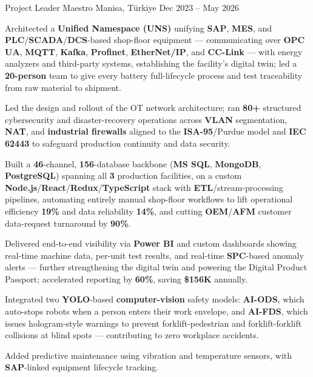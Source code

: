 \begin{cventries}
  \cventry
    {Project Leader } %
{Maestro} %
    {Manisa, Türkiye} %
    {Dec 2023 – May 2026} %
    {
      \begin{cvitems} %
        \item {Architected a \textbf{Unified Namespace (UNS)} unifying \textbf{SAP}, \textbf{MES}, and \textbf{PLC}/\textbf{SCADA}/\textbf{DCS}-based shop-floor equipment --- communicating over \textbf{OPC UA}, \textbf{MQTT}, \textbf{Kafka}, \textbf{Profinet}, \textbf{EtherNet/IP}, and \textbf{CC-Link} --- with energy analyzers and third-party systems, establishing the facility's digital twin; led a \textbf{20-person} team to give every battery full-lifecycle process and test traceability from raw material to shipment.}
        \item {Led the design and rollout of the OT network architecture; ran \textbf{80+} structured cybersecurity and disaster-recovery operations across \textbf{VLAN} segmentation, \textbf{NAT}, and \textbf{industrial firewalls} aligned to the \textbf{ISA-95}/Purdue model and \textbf{IEC 62443} to safeguard production continuity and data security.}
        \item {Built a \textbf{46}-channel, \textbf{156}-database backbone (\textbf{MS SQL}, \textbf{MongoDB}, \textbf{PostgreSQL}) spanning all \textbf{3} production facilities, on a custom \textbf{Node.js}/\textbf{React}/\textbf{Redux}/\textbf{TypeScript} stack with \textbf{ETL}/stream-processing pipelines, automating entirely manual shop-floor workflows to lift operational efficiency \textbf{19\%} and data reliability \textbf{14\%}, and cutting \textbf{OEM}/\textbf{AFM} customer data-request turnaround by \textbf{90\%}.}
        \item {Delivered end-to-end visibility via \textbf{Power BI} and custom dashboards showing real-time machine data, per-unit test results, and real-time \textbf{SPC}-based anomaly alerts --- further strengthening the digital twin and powering the Digital Product Passport; accelerated reporting by \textbf{60\%}, saving \textbf{\$156K} annually.}
        \item {Integrated two \textbf{YOLO}-based \textbf{computer-vision} safety models: \textbf{AI-ODS}, which auto-stops robots when a person enters their work envelope, and \textbf{AI-FDS}, which issues hologram-style warnings to prevent forklift-pedestrian and forklift-forklift collisions at blind spots --- contributing to zero workplace accidents.}
        \item {Added predictive maintenance using vibration and temperature sensors, with \textbf{SAP}-linked equipment lifecycle tracking.}
      \end{cvitems}
    }


\end{cventries}
